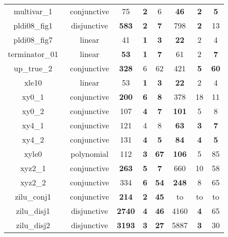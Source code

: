 \begin{table}[t]
\begin{tabular}{l c | c c c | c c c |}
\multicolumn{1}{|c|}{multivar\_1~\cite{jeannet2010interproc}}	&conjunctive	&75	&\textbf{2}	&6	&\textbf{46}	&\textbf{2}	&\textbf{5}\\
\multicolumn{1}{|c|}{pldi08\_fig1~\cite{gulavani2008automatically}}&disjunctive	&\textbf{583} & \textbf{2} & \textbf{7}   &798 & \textbf{2} & 13				\\
\multicolumn{1}{|c|}{pldi08\_fig7~\cite{gulavani2008automatically}}	&linear		&41	&\textbf{1}	&\textbf{3}	&\textbf{22}	&2	&4\\
\multicolumn{1}{|c|}{terminator\_01~\cite{Dirk:SVCOMP:2016}}	&linear 			&\textbf{53}	&\textbf{1}	&\textbf{7}	&61	&2	&\textbf{7}\\
\multicolumn{1}{|c|}{up\_true\_2~\cite{isil2013inductive}}		&conjunctive	&\textbf{328}	&6	&62					   &421	&\textbf{5}	&\textbf{60}		\\
\multicolumn{1}{|c|}{xle10~\cite{sharma2012interpolants}}		&linear 		&53	&\textbf{1}	&\textbf{3}	&\textbf{22}	&2	&4\\
\multicolumn{1}{|c|}{xy0\_1~\cite{sharma2012interpolants}}		&conjunctive	&\textbf{200}	&\textbf{6}	&\textbf{8}	&378	&18	&11\\
\multicolumn{1}{|c|}{xy0\_2~\cite{sharma2012interpolants}}		&conjunctive	&107	&\textbf{4}	&\textbf{7}	&\textbf{101}	&5	&8\\
\multicolumn{1}{|c|}{xy4\_1~\cite{sharma2012interpolants}}		&conjunctive	&121	&4   &8 &\textbf{63}	&\textbf{3}	&\textbf{7}\\
\multicolumn{1}{|c|}{xy4\_2~\cite{sharma2012interpolants}}		&conjunctive	&131	&\textbf{4}	&\textbf{5}	&\textbf{84}	&\textbf{4}	&\textbf{5}\\
\multicolumn{1}{|c|}{xyle0~\cite{sharma2012interpolants}}		&polynomial 	&112 &\textbf{3}	&\textbf{67}   &\textbf{106}	&5	&85						\\
\multicolumn{1}{|c|}{xyz2\_1~\cite{sharma2012interpolants}}		&conjunctive	&\textbf{263}	&\textbf{5}	&\textbf{7}	&660	&10	&58\\
\multicolumn{1}{|c|}{xyz2\_2~\cite{sharma2012interpolants}}		&conjunctive	&334	&\textbf{6}	&\textbf{54}		 &\textbf{248} &8 &65	\\
\multicolumn{1}{|c|}{zilu\_conj1~\cite{zilu:repo}}				&conjunctive	&\textbf{214}	&\textbf{2}	&\textbf{45}	         &to	&to	&to			\\
\multicolumn{1}{|c|}{zilu\_disj1~\cite{zilu:repo}}				&disjunctive	&\xmark \textbf{2740} & \textbf{4} &\textbf{46}        &4160 	& \textbf{4} &{65} 	\\
\multicolumn{1}{|c|}{zilu\_disj2~\cite{zilu:repo}}				&disjunctive	&\xmark \textbf{3193} & \textbf{3} & \textbf{27}	     &5887 & \textbf{3} & 30  	\\

\end{tabular}
\end{table}
